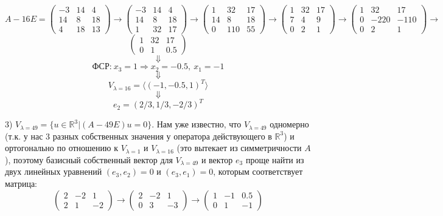 \documentclass{article}
\begin{document}
$$A-16E=\left(\begin{array}{rrr}-3 & 14 & 4\\14 & 8 & 18\\4 & 18 & 13\end{array}\right)\rightarrow\left(\begin{array}{rrr}-3 & 14 & 4\\14 & 8 & 18\\1 & 32 & 17\end{array}\right)\rightarrow\left(\begin{array}{rrr}1 & 32 & 17\\14 & 8 & 18\\0 & 110 & 55\end{array}\right)\rightarrow\left(\begin{array}{rrr}1 & 32 & 17\\7 & 4 & 9\\0 & 2 & 1\end{array}\right)\rightarrow\left(\begin{array}{rrr}1 & 32 & 17\\0 & -220 & -110\\0 & 2 & 1\end{array}\right)\rightarrow$$
$$\left(\begin{array}{rrr}1 & 32 & 17\\0 & 1 & 0.5\end{array}\right)$$
$$\Downarrow$$
$$\textrm{ФСР:}\ x_3=1\Rightarrow x_2 = -0.5,\ x_1=-1$$
$$\Downarrow$$
$$V_{\lambda=16}=\langle (-1,-0.5, 1)^T \rangle$$
$$\Downarrow$$
$$e_2=(2/3,1/3,-2/3)^T$$
\par
3) $V_{\lambda=49}=\{u\in\mathbb{R}^3|(A-49E)u=0\}$. Нам уже известно, что $V_{\lambda=49}$ одномерно (т.к. у нас 3 разных собственных значения у оператора действующего в $\mathbb{R}^3$) и ортогонально по отношению к $V_{\lambda=1}$ и $V_{\lambda=16}$ (это вытекает из симметричности $A$), поэтому базисный собственный вектор для $V_{\lambda=49}$ и вектор $e_3$ проще найти из двух линейных уравнений $(e_3, e_2)=0$ и $(e_3, e_1)=0$, которым соответствует матрица:
$$\left(\begin{array}{rrr}2 & -2 & 1\\2 & 1 & -2\end{array}\right)\rightarrow\left(\begin{array}{rrr}2 & -2 & 1\\0 & 3 & -3\end{array}\right)\rightarrow\left(\begin{array}{rrr}1 & -1 & 0.5\\0 & 1 & -1\end{array}\right)$$
\end{document}
